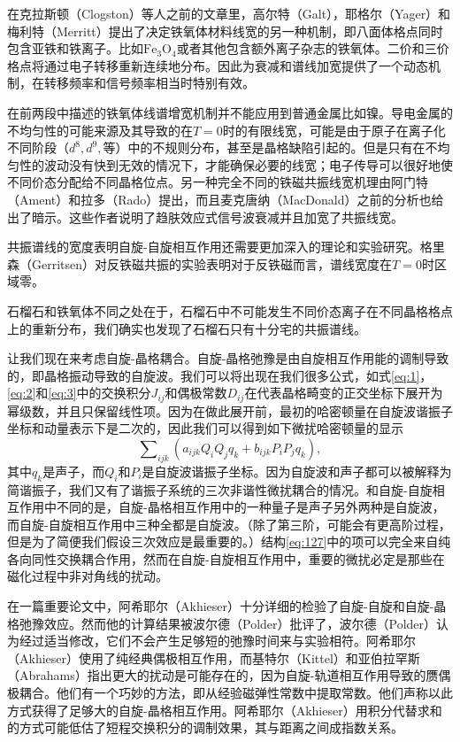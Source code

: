 \documentclass{article}
\begin{document}
在克拉斯顿（Clogston）等人之前的文章里，高尔特（Galt），耶格尔（Yager）和梅利特（Merritt）提出了决定铁氧体材料线宽的另一种机制，即八面体格点同时包含亚铁和铁离子。比如$\mathrm{Fe_3O_4}$或者其他包含额外离子杂志的铁氧体。二价和三价格点将通过电子转移重新连续地分布。因此为衰减和谱线加宽提供了一个动态机制，在转移频率和信号频率相当时特别有效。

在前两段中描述的铁氧体线谱增宽机制并不能应用到普通金属比如镍。导电金属的不均匀性的可能来源及其导致的在$T=0$时的有限线宽，可能是由于原子在离子化不同阶段（$d^8,d^9,等$）中的不规则分布，甚至是晶格缺陷引起的。但是只有在不均匀性的波动没有快到无效的情况下，才能确保必要的线宽；电子传导可以很好地使不同价态分配给不同晶格位点。另一种完全不同的铁磁共振线宽机理由阿门特（Ament）和拉多（Rado）提出，而且麦克唐纳（MacDonald）之前的分析也给出了暗示。这些作者说明了趋肤效应式信号波衰减并且加宽了共振线宽。

共振谱线的宽度表明自旋-自旋相互作用还需要更加深入的理论和实验研究。格里森（Gerritsen）对反铁磁共振的实验表明对于反铁磁而言，谱线宽度在$T=0$时区域零。

石榴石和铁氧体不同之处在于，石榴石中不可能发生不同价态离子在不同晶格格点上的重新分布，我们确实也发现了石榴石只有十分宅的共振谱线。

让我们现在来考虑自旋-晶格耦合。自旋-晶格弛豫是由自旋相互作用能的调制导致的，即晶格振动导致的自旋波。我们可以将出现在我们很多公式，如式\eqref{eq:1}，\eqref{eq:2}和\eqref{eq:3}中的交换积分$J_{ij}$和偶极常数$D_{ij}$在代表晶格畸变的正交坐标下展开为幂级数，并且只保留线性项。因为在做此展开前，最初的哈密顿量在自旋波谐振子坐标和动量表示下是二次的，因此我们可以得到如下微扰哈密顿量的显示
\begin{equation} \label{eq:127}
\sum\nolimits_{\mathit{ijk}}(a_\mathit{ijk}Q_iQ_jq_k+b_\mathit{ijk}P_iP_jq_k),
\end{equation}
其中$q_k$是声子，而$Q_i$和$P_i$是自旋波谐振子坐标。因为自旋波和声子都可以被解释为简谐振子，我们又有了谐振子系统的三次非谐性微扰耦合的情况。和自旋-自旋相互作用中不同的是，自旋-晶格相互作用中的一种量子是声子另外两种是自旋波，而自旋-自旋相互作用中三种全都是自旋波。（除了第三阶，可能会有更高阶过程，但是为了简便我们假设三次效应是最重要的。）结构\eqref{eq:127}中的项可以完全来自纯各向同性交换耦合作用，然而在自旋-自旋相互作用中，重要的微扰必定是那些在磁化过程中非对角线的扰动。

在一篇重要论文中，阿希耶尔（Akhieser）十分详细的检验了自旋-自旋和自旋-晶格弛豫效应。然而他的计算结果被波尔德（Polder）批评了，波尔德（Polder）认为经过适当修改，它们不会产生足够短的弛豫时间来与实验相符。阿希耶尔（Akhieser）使用了纯经典偶极相互作用，而基特尔（Kittel）和亚伯拉罕斯（Abrahams）指出更大的扰动是可能存在的，因为自旋-轨道相互作用导致的赝偶极耦合。他们有一个巧妙的方法，即从经验磁弹性常数中提取常数。他们声称以此方式获得了足够大的自旋-晶格相互作用。阿希耶尔（Akhieser）用积分代替求和的方式可能低估了短程交换积分的调制效果，其与距离之间成指数关系。
\end{document}
